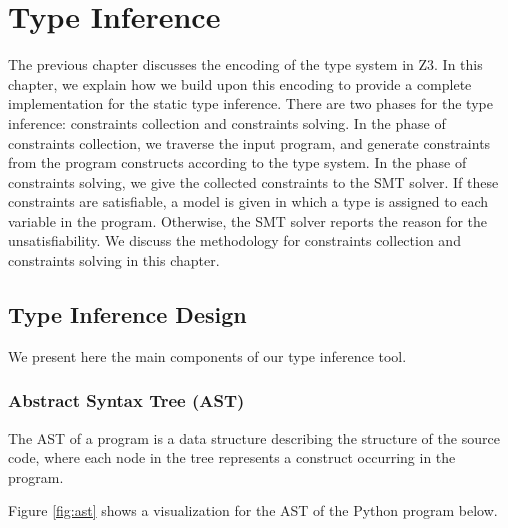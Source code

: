 
\chapter{Type Inference}\label{chapter:ti}
The previous chapter discusses the encoding of the type system in Z3. In this chapter, we explain how we build upon this encoding to provide a complete implementation for the static type inference. There are two phases for the type inference: constraints collection and constraints solving. In the phase of constraints collection, we traverse the input program, and generate constraints from the program constructs according to the type system. In the phase of constraints solving, we give the collected constraints to the SMT solver. If these constraints are satisfiable, a model is given in which a type is assigned to each variable in the program. Otherwise, the SMT solver reports the reason for the unsatisfiability. We discuss the methodology for constraints collection and constraints solving in this chapter.

\section{Type Inference Design}
We present here the main components of our type inference tool.
\subsection{Abstract Syntax Tree (AST)}
The AST of a program is a data structure describing the structure of the source code, where each node in the tree represents a construct occurring in the program.

Figure \ref{fig:ast} shows a visualization for the AST of the Python program below.

